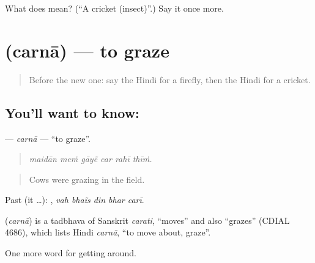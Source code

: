 \begin{tcolorbox}[breakable,colback=teal!4,colframe=teal!35!black,title={Before you move on}]
What does  mean? (\textquotedblleft{}A cricket (insect)\textquotedblright{}.) Say it once more.
\end{tcolorbox}
\section[\texorpdfstring{\hi{चरना} (carnā)}{चरना (carnā)}]{ (carnā) — to graze}

\label{lesson:HI-C449-carna}



\begin{quote}
Before the new one: say the Hindi for a firefly, then the Hindi for a cricket.
\end{quote}

\subsection*{You'll want to know: }
\textbf{} — \emph{carnā} — \textquotedblleft{}to graze\textquotedblright{}.

\begin{quote}
     
\end{quote}

\begin{quote}
\emph{maidān meṁ gāyẽ car rahī thīṁ.}
\end{quote}

\begin{quote}
Cows were grazing in the field.
\end{quote}

Past (it …):     , \emph{vah bhaĩs din bhar carī}.

\begin{cousinweb}
\textbf{} (\emph{carnā}) is a tadbhava of Sanskrit \emph{carati}, \textquotedblleft{}moves\textquotedblright{} and also \textquotedblleft{}grazes\textquotedblright{} (CDIAL 4686), which lists Hindi \emph{carnā}, \textquotedblleft{}to move about, graze\textquotedblright{}.
\end{cousinweb}

\begin{grammarlens}[title={What you've built}]
One more word for getting around.
\end{grammarlens}

